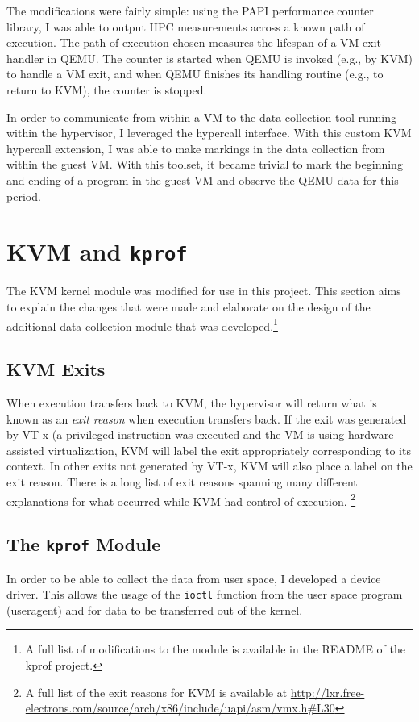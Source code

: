 \documentclass[notitlepage]{article}
\begin{document}
The modifications were fairly simple: using the PAPI performance counter
library, I was able to output HPC measurements across a known path of execution.
The path of execution chosen measures the lifespan of a VM exit handler in QEMU.
The counter is started when QEMU is invoked (e.g., by KVM) to handle a VM exit,
and when QEMU finishes its handling routine (e.g., to return to KVM), the
counter is stopped.

In order to communicate from within a VM to the data collection tool running
within the hypervisor, I leveraged the hypercall interface. With this custom KVM
hypercall extension, I was able to make markings in the data collection from
within the guest VM. With this toolset, it became trivial to mark the beginning
and ending of a program in the guest VM and observe the QEMU data for this
period.


\section{KVM and \texttt{kprof}}
\label{sec:kvm}
The KVM kernel module was modified for use in this project. This section aims to
explain the changes that were made and elaborate on the design of the additional
data collection module that was developed.\footnote{A full list of modifications
to the module is available in the README of the kprof project.}

\subsection{KVM Exits}
When execution transfers back to KVM, the hypervisor will return what is known
as an \textit{exit reason} when execution transfers back. If the exit was
generated by VT-x (a privileged instruction was executed and the VM is using
hardware-assisted virtualization, KVM will label the exit appropriately
corresponding to its context. In other exits not generated by VT-x, KVM will
also place a label on the exit reason. There is a long list of exit reasons
spanning many different explanations for what occurred while KVM had control of
execution. \footnote{A full list of the exit reasons for KVM is available at
\url{http://lxr.free-electrons.com/source/arch/x86/include/uapi/asm/vmx.h\#L30}}

\subsection{The \texttt{kprof} Module}
In order to be able to collect the data from user space, I developed a device
driver. This allows the usage of the \texttt{ioctl} function from the user space
program (useragent) and for data to be transferred out of the kernel.
\end{document}
